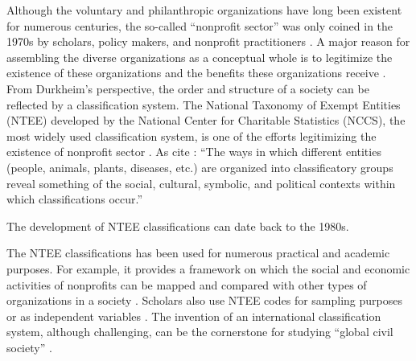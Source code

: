 \documentclass[12pt]{article}
\begin{document}
Although the voluntary and philanthropic organizations have long been existent for numerous centuries, the so-called ``nonprofit sector'' was only coined in the 1970s by scholars, policy makers, and nonprofit practitioners \parencite{HallHistoricalOverviewPhilanthropy2006}. A major reason for assembling the diverse organizations as a conceptual whole is to legitimize the existence of these organizations and the benefits these organizations receive \parencite{HallHistoricalOverviewPhilanthropy2006,BarmanClassificatoryStrugglesNonprofit2013}. From Durkheim's \citeyear{DurkheimElementaryFormsReligious2012} perspective, the order and structure of a society can be reflected by a classification system. The National Taxonomy of Exempt Entities (NTEE) developed by the National Center for Charitable Statistics (NCCS), the most widely used classification system, is one of the efforts legitimizing the existence of nonprofit sector \parencite{Hodgkinsonnewresearchplanning1991,HodgkinsonMappingnonprofitsector1990}. As \textcite[105]{BarmanClassificatoryStrugglesNonprofit2013} cite \textcite[601]{ClarkeSimpleTechnologyComplex1996}: ``The ways in which different entities (people, animals, plants, diseases, etc.) are organized into classificatory groups reveal something of the social, cultural, symbolic, and political contexts within which classifications occur.''

The development of NTEE classifications can date back to the 1980s. 

The NTEE classifications has been used for numerous practical and academic purposes. For example, it provides a framework on which the social and economic activities of nonprofits can be mapped and compared with other types of organizations in a society \parencite[e.g.,][]{RoegerNonprofitSectorIts2015}. Scholars also use NTEE codes for sampling purposes \parencite[e.g.,][]{OktenDeterminantsdonationsprivate2000,CarmanEvaluationCapacityNonprofit2010} or as independent variables \parencite{SloanEffectsNonprofitAccountability2009}. The invention of an international classification system, although challenging, can be the cornerstone for studying ``global civil society'' \parencite{VakilConfrontingclassificationproblem1997,Salamonsearchnonprofitsector1992,Salamoninternationalclassificationnonprofit1996}.
\end{document}
